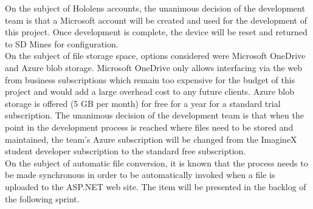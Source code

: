         On the subject of Hololens accounts, the unanimous decision of the development team is that a Microsoft
        account will be created and used for the development of this project.  Once development is complete, the 
        device will be reset and returned to SD Mines for configuration.\\

        On the subject of file storage space, options considered were Microsoft OneDrive and Azure blob storage.
        Microsoft OneDrive only allows interfacing via the web from business subscriptions which remain too 
        expensive for the budget of this project and would add a large overhead cost to any future clients.
        Azure blob storage is offered (5 GB per month) for free for a year for a standard trial subscription.
        The unanimous decision of the development team is that when the point in the development process is reached
        where files need to be stored and maintained, the team's Azure subscription will be changed from the 
        ImagineX student developer subscription to the standard free subscription.\\
        
        On the subject of automatic file conversion, it is known that the process needs to be made synchronous
        in order to be automatically invoked when a file is uploaded to the ASP.NET web site.  The item will be
        presented in the backlog of the following sprint.
